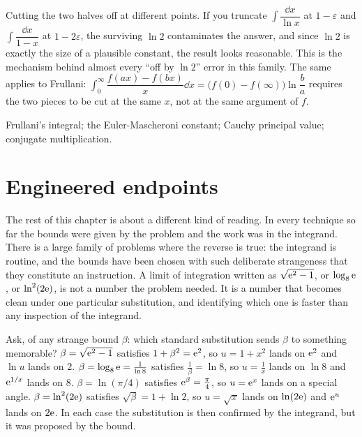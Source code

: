 \begin{trap}
Cutting the two halves off at different points. If you truncate $\int\dfrac{\dd x}{\ln x}$ at $1-\varepsilon$ and $\int\dfrac{\dd x}{1-x}$ at $1-2\varepsilon$, the surviving $\ln2$ contaminates the answer, and since $\ln2$ is exactly the size of a plausible constant, the result looks reasonable. This is the mechanism behind almost every ``off by $\ln2$'' error in this family. The same applies to Frullani: $\int_0^{\infty}\dfrac{f(ax)-f(bx)}{x}\dd x=\bigl(f(0)-f(\infty)\bigr)\ln\dfrac ba$ requires the two pieces to be cut at the same $x$, not at the same argument of $f$.
\end{trap}

\begin{seealsob}Frullani's integral; the Euler-Mascheroni constant; Cauchy principal value; conjugate multiplication.\end{seealsob}

\section{Engineered endpoints}

The rest of this chapter is about a different kind of reading. In every technique so far the bounds were given by the problem and the work was in the integrand. There is a large family of problems where the reverse is true: the integrand is routine, and the bounds have been chosen with such deliberate strangeness that they constitute an instruction. A limit of integration written as $\sqrt{\mathrm{e}^{2}-1}$, or $\log_{8}\mathrm{e}$, or $\ln^{2}(2\mathrm{e})$, is not a number the problem needed. It is a number that becomes clean under one particular substitution, and identifying which one is faster than any inspection of the integrand.

\begin{keynote}
Ask, of any strange bound $\beta$: which standard substitution sends $\beta$ to something memorable? $\beta=\sqrt{\mathrm{e}^{2}-1}$ satisfies $1+\beta^{2}=\mathrm{e}^{2}$, so $u=1+x^{2}$ lands on $\mathrm{e}^{2}$ and $\ln u$ lands on $2$. $\beta=\log_{8}\mathrm{e}=\tfrac{1}{\ln8}$ satisfies $\tfrac1\beta=\ln8$, so $u=\tfrac1x$ lands on $\ln8$ and $\mathrm{e}^{1/x}$ lands on $8$. $\beta=\ln(\pi/4)$ satisfies $\mathrm{e}^{\beta}=\tfrac{\pi}{4}$, so $u=\mathrm{e}^{x}$ lands on a special angle. $\beta=\ln^{2}(2\mathrm{e})$ satisfies $\sqrt\beta=1+\ln2$, so $u=\sqrt x$ lands on $\ln(2\mathrm{e})$ and $\mathrm{e}^{u}$ lands on $2\mathrm{e}$. In each case the substitution is then confirmed by the integrand, but it was proposed by the bound.
\end{keynote}

